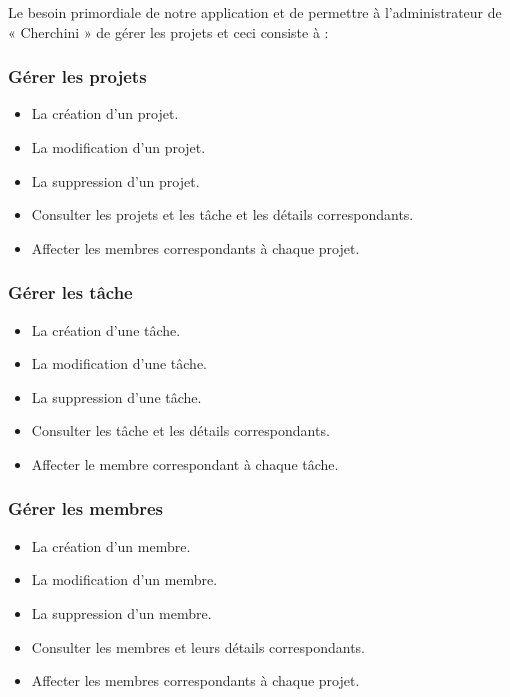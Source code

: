 Le besoin primordiale de notre application et de permettre à l’administrateur
de « Cherchini » de gérer les projets et ceci consiste à :

\subsubsection{G\'{e}rer les projets}

\begin{itemize}
\item{La cr\'{e}ation d’un projet.}
\item{La modification d'un projet.}
\item{La suppression d'un projet.}
\item{Consulter les projets et les t\^{a}che et les d\'{e}tails correspondants.}
\item{Affecter les membres correspondants \`{a} chaque projet.}
\end{itemize}

\subsubsection{G\'{e}rer les t\^{a}che}

\begin{itemize}
\item{La cr\'{e}ation d'une t\^{a}che.}
\item{La modification d'une t\^{a}che.}
\item{La suppression d'une t\^{a}che.}
\item{Consulter les t\^{a}che et les d\'{e}tails correspondants.}
\item{Affecter le membre correspondant \`{a} chaque t\^{a}che.}
\end{itemize}

\subsubsection{G\'{e}rer les membres}

\begin{itemize}
\item{La cr\'{e}ation d'un membre.}
\item{La modification d'un membre.}
\item{La suppression d'un membre.}
\item{Consulter les membres et leurs d\'{e}tails correspondants.}
\item{Affecter les membres correspondants \`{a} chaque projet.}
\end{itemize}

